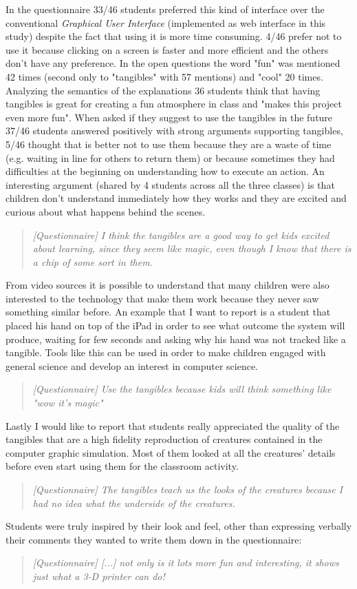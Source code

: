 In the questionnaire 33/46 students preferred this kind of interface over the conventional \textit{Graphical User Interface} (implemented as web interface in this study) despite the fact that using it is more time consuming. 4/46 prefer not to use it because clicking on a screen is faster and more efficient and the others don't have any preference. In the open questions the word "fun" was mentioned 42 times (second only to "tangibles" with 57 mentions) and "cool" 20 times. Analyzing the semantics of the explanations 36 students think that having tangibles is great for creating a fun atmosphere in class and "makes this project even more fun". When asked if they suggest to use the tangibles in the future 37/46 students answered positively with strong arguments supporting tangibles, 5/46 thought that is better not to use them because they are a waste of time (e.g. waiting in line for others to return them) or because sometimes they had difficulties at the beginning on understanding how to execute an action. An interesting argument (shared by 4 students across all the three classes) is that children don't understand immediately how they works and they are excited and curious about what happens behind the scenes.
\begin{quote}
\textit{[Questionnaire]
I think the tangibles are a good way to get kids excited about learning, since they seem like magic, even though I know that there is a chip of some sort in them.}
\end{quote}
From video sources it is possible to understand that many children were also interested to the technology that make them work because they never saw something similar before. An example that I want to report is a student that placed his hand on top of the iPad in order to see what outcome the system will produce, waiting for few seconds and asking why his hand was not tracked like a tangible. Tools like this can be used in order to make children engaged with general science and develop an interest in computer science.
\begin{quote}
\textit{[Questionnaire]
Use the tangibles because kids will think something like "wow it's magic"}
\end{quote}

Lastly I would like to report that students really appreciated the quality of the tangibles that are a high fidelity reproduction of creatures contained in the computer graphic simulation. Most of them looked at all the creatures’ details before even start using them for the classroom activity.
\begin{quote}
\textit{[Questionnaire]
The tangibles teach us the looks of the creatures because I had no idea what the underside of the creatures.}
\end{quote}
Students were truly inspired by their look and feel, other than expressing verbally their comments they wanted to write them down in the questionnaire:
\begin{quote}
\textit{[Questionnaire]
[...] not only is it lots more fun and interesting, it shows just what a 3-D printer can do!}
\end{quote}

